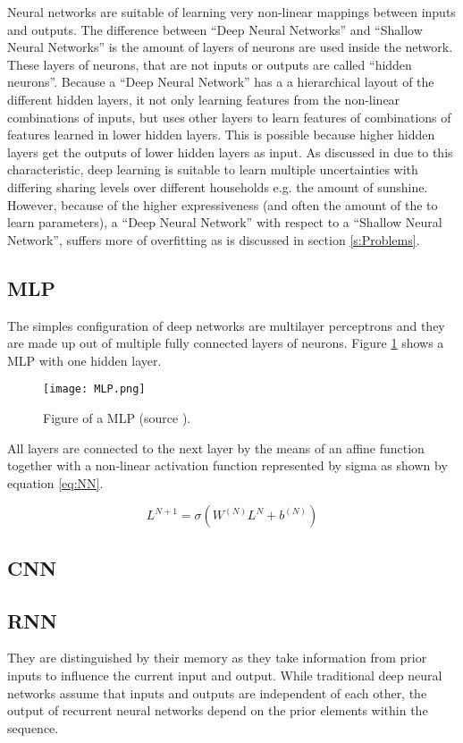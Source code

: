Neural networks are suitable of learning very non-linear mappings between inputs and outputs. The difference between ``Deep Neural Networks'' and ``Shallow Neural Networks'' is the amount of layers of neurons are used inside the network. These layers of neurons, that are not inputs or outputs are called ``hidden neurons''. Because a ``Deep Neural Network'' has a a hierarchical layout of the different hidden layers, it not only learning features from the non-linear combinations of inputs, but uses other layers to learn features of combinations of features learned in lower hidden layers. This is possible because higher hidden layers get the outputs of lower hidden layers as input. As discussed in  \cite{Shi2018} due to this characteristic, deep learning is suitable to learn multiple uncertainties with differing sharing levels over different households e.g. the amount of sunshine. However, because of the higher expressiveness (and often the amount of the to learn parameters), a ``Deep Neural Network'' with respect to a ``Shallow Neural Network'', suffers more of overfitting as is discussed in section \ref{s:Problems}.

\subsection{MLP}
The simples configuration of deep networks are multilayer perceptrons and they are made up out of multiple fully connected layers of neurons. Figure \ref{fig:MLP} shows a MLP with one hidden layer.

\begin{figure}[h!]
	\centering
	\texttt{[image: MLP.png]}
	\caption{Figure of a MLP (source \cite{Czum2020}).}
	\label{fig:MLP}
\end{figure}

All layers are connected to the next layer by the means of an affine function together with a non-linear activation function represented by sigma as shown by equation \ref{eq:NN}.

\begin{equation}\label{eq:NN}
	L^{N+1} = \sigma(W^{(N)}L^{N}+b^{(N)})
\end{equation}


\subsection{CNN}


\subsection{RNN}
They are distinguished by their memory as they take information from prior inputs to influence the current input and output. While traditional deep neural networks assume that inputs and outputs are independent of each other, the output of recurrent neural networks depend on the prior elements within the sequence.


